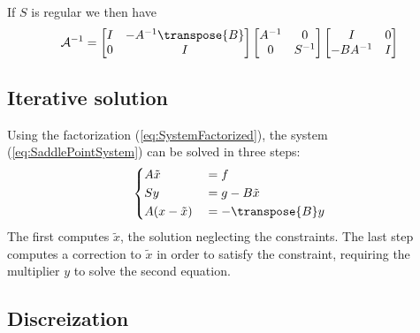 If $S$ is regular we then have
%
\begin{align*}
{\mathcal A}^{-1}
= 
\begin{bmatrix}
I & -A^{-1}\transpose{B}\\
0 & I
\end{bmatrix}
\begin{bmatrix}
A^{-1} & 0\\
0 & S^{-1}
\end{bmatrix}
\begin{bmatrix}
I & 0\\
-BA^{-1} & I
\end{bmatrix}
\end{align*}
%
%
\subsection{Iterative solution}\label{subsec:}
%
Using the factorization (\ref{eq:SystemFactorized}), the system (\ref{eq:SaddlePointSystem}) can be solved in three steps:
%
\begin{equation}\label{eq:}
%
\left\{
\begin{aligned}
&A \tilde x &&= f\\
&S y &&= g-B\tilde x\\
&A(x-\tilde x) &&=  - \transpose{B} y
\end{aligned}
\right.
%
\end{equation}
%
The first computes $\tilde x$, the solution neglecting the constraints. The last step computes a correction to $\tilde x$ in order to satisfy the constraint, requiring the multiplier $y$ to solve the second equation.
%
\subsection{Discreization}\label{subsec:}
%


\printbibliography[title=References Section~\thesection]



